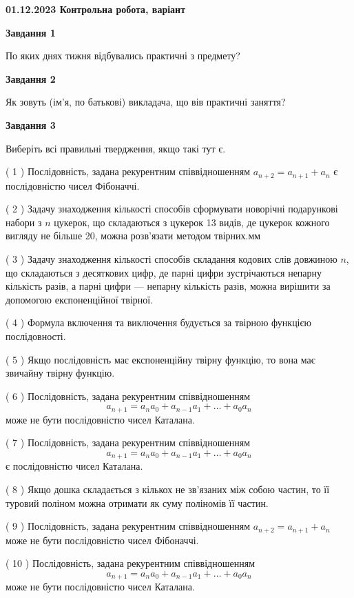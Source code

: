 \documentclass[12pt, ukrainian]{article}
\begin{document}
\begin {large}

\textbf{01.12.2023 Контрольна робота, варіант  }\par


{
{\begin {center}\textbf{Завдання 1}\end {center}}\par
По яких днях тижня відбувались практичні з предмету?\par
{\begin {center}\textbf{Завдання 2}\end {center}}\par
Як зовуть (ім'я, по батькові) викладача, що вів практичні заняття?\par
{\begin {center}\textbf{Завдання 3}\end {center}}\par
Виберіть всі правильні твердження, якщо такі тут є.\par
\vspace{2mm}
( 1 ) Послідовність, задана рекурентним співвідношенням $a_{n+2}=a_{n+1}+a_{n}$ є послідовністю чисел Фібоначчі.%

( 2 ) Задачу знаходження кількості способів сформувати новорічні подарункові набори з $n$ цукерок, що складаються з цукерок 13 видів, де цукерок кожного вигляду не більше 20, можна розв’язати методом твірних.мм%

( 3 ) Задачу знаходження кількості способів складання кодових слів довжиною $n$, що складаються з десяткових цифр, де парні цифри зустрічаються непарну кількість разів, а парні цифри — непарну кількість разів, можна вирішити за допомогою експоненційної твірної.%

( 4 ) Формула включення та виключення будується за твірною функцією послідовності.%

( 5 ) Якщо послідовність має експоненційну твірну функцію, то вона має звичайну твірну функцію.%

( 6 ) Послідовність, задана рекурентним співвідношенням $$a_{n+1}=a_{n}a_{0}+a_{n-1}a_{1}+\ldots+a_0a_{n}$$ може не бути послідовністю чисел Каталана.%

( 7 ) Послідовність, задана рекурентним співвідношенням $$a_{n+1}=a_{n}a_{0}+a_{n-1}a_{1}+\ldots+a_0a_{n}$$ є послідовністю чисел Каталана.%

( 8 ) Якщо дошка складається з кількох не зв’язаних між собою частин, то її туровий поліном можна отримати як суму поліномів її частин.%

( 9 ) Послідовність, задана рекурентним співвідношенням $a_{n+2}=a_{n+1}+a_{n}$ може не бути послідовністю чисел Фібоначчі.%

( 10 ) Послідовність, задана рекурентним співвідношенням $$a_{n+1}=a_{n}a_{0}+a_{n-1}a_{1}+\ldots+a_0a_{n}$$ може не бути послідовністю чисел Каталана.%
}
\end {large}

\vspace{4mm}
\newpage
\end{document}
